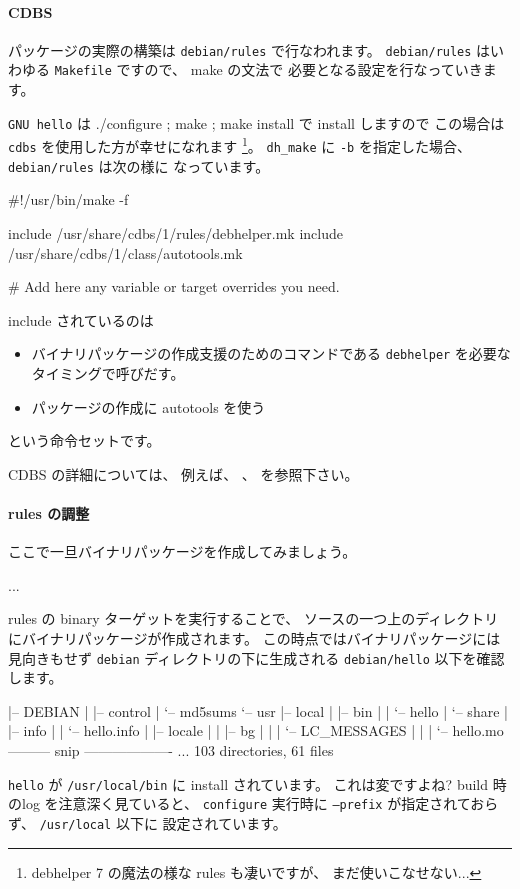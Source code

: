 \documentclass[mingoth,a4paper]{jsarticle}
\begin{document}
\paragraph{CDBS}

パッケージの実際の構築は {\tt debian/rules} で行なわれます。
{\tt debian/rules} はいわゆる {\tt Makefile} ですので、 make の文法で
必要となる設定を行なっていきます。

{\tt GNU hello} は
./configure ; make ; make install で install しますので
この場合は {\tt cdbs} を使用した方が幸せになれます%
\footnote{%
 debhelper 7 の魔法の様な rules も凄いですが、 まだ使いこなせない...}。
{\tt dh\_make} に {\tt -b} を指定した場合、 {\tt debian/rules} は次の様に
なっています。
\begin{commandline}
 #!/usr/bin/make -f

include /usr/share/cdbs/1/rules/debhelper.mk
include /usr/share/cdbs/1/class/autotools.mk


# Add here any variable or target overrides you need.
\end{commandline}
include されているのは
\begin{itemize}
      \item バイナリパッケージの作成支援のためのコマンドである
    {\tt debhelper} を必要なタイミングで呼びだす。
    \item パッケージの作成に autotools を使う
\end{itemize}
という命令セットです。

CDBS の詳細については、 
例えば\cite{CDBS1st}、 \cite{CDBS ギャラリ}、 \cite{CDBS doc}を参照下さい。

\paragraph{rules の調整}

ここで一旦バイナリパッケージを作成してみましょう。
\begin{commandline}
  ...
\end{commandline}

rules の binary ターゲットを実行することで、 
ソースの一つ上のディレクトリにバイナリパッケージが作成されます。
この時点ではバイナリパッケージには見向きもせず
{\tt debian} ディレクトリの下に生成される
{\tt debian/hello} 以下を確認します。
\begin{commandline}
|-- DEBIAN
|   |-- control
|   `-- md5sums
`-- usr
    |-- local
    |   |-- bin
    |   |   `-- hello
    |   `-- share
    |       |-- info
    |       |   `-- hello.info
    |       |-- locale
    |       |   |-- bg
    |       |   |   `-- LC_MESSAGES
    |       |   |       `-- hello.mo
--------- snip -------------------
...
103 directories, 61 files
\end{commandline}
{\tt hello} が {\tt /usr/local/bin} に install されています。
これは変ですよね? build 時のlog を注意深く見ていると、 {\tt configure} 
実行時に {\tt --prefix} が指定されておらず、 {\tt /usr/local} 以下に
設定されています。
\end{document}
